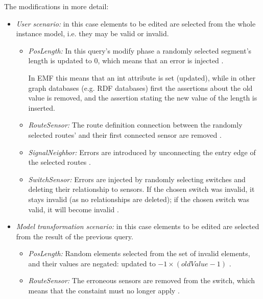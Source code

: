 The modifications in more detail:
\begin{itemize}
  \item \emph{User scenario:} in this case elements to be edited are selected from the whole instance model, i.e. they may be valid or invalid. 
  \begin{itemize}
    
    \item \emph{PosLength:} In this query's modify phase a randomly selected segment's length is updated to 0, which means that an error is injected .
    
    In EMF this means that an int attribute is set (updated), while in other graph databases (e.g. RDF databases) first the assertions about the old value is removed, and the assertion stating the new value of the length is inserted.
    
    \item \emph{RouteSensor:} The route definition connection between the randomly selected routes' and their first connected sensor are removed .
    
    \item \emph{SignalNeighbor:} Errors are introduced by unconnecting the entry edge of the selected routes .

    \item \emph{SwitchSensor:} Errors are injected by randomly selecting switches and deleting their relationship to sensors. If the chosen switch was invalid, it stays invalid (as no relationships are deleted); if the chosen switch was valid, it will become invalid .
        
  \end{itemize}
  \item \emph{Model transformation scenario:} in this case elements to be edited are selected from the result of the previous query.
  \begin{itemize}
    
    \item \emph{PosLength:} Random elements selected from the set of invalid elements, and their values are negated: updated to $-1 \times (\mathit{oldValue}-1)$ .
    
    \item \emph{RouteSensor:} The erroneous sensors are removed from the switch, which means that the constaint must no longer apply .
    

\end{itemize}
\end{itemize}
